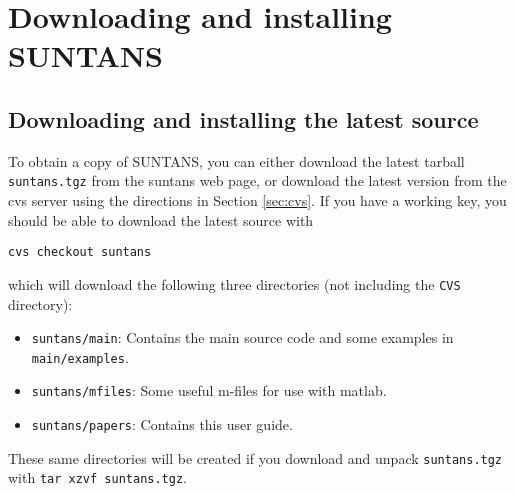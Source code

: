 \section{Downloading and installing SUNTANS}

\subsection{Downloading and installing the latest source} \label{sec:download}

To obtain a copy of SUNTANS, you can either download the latest tarball \verb+suntans.tgz+ from
the suntans web page, or download the latest version from the cvs server
using the directions in Section \ref{sec:cvs}.  If you have a working key, you should
be able to download the latest source with
\begin{verbatim}
cvs checkout suntans
\end{verbatim}
which will download the following three directories (not including the \verb+CVS+ directory):
\begin{itemize}
\item \verb+suntans/main+: Contains the main source code and some examples in \verb+main/examples+.
\item \verb+suntans/mfiles+: Some useful m-files for use with matlab.
\item \verb+suntans/papers+: Contains this user guide.
\end{itemize}
These same directories will be created if you download and unpack \verb+suntans.tgz+ with \verb+tar xzvf suntans.tgz+.

